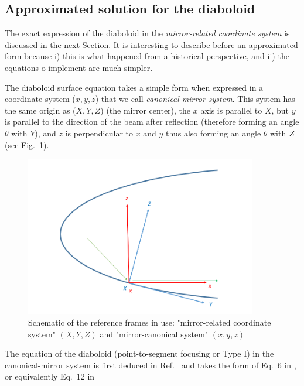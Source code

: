 \documentclass{iucr}              %
\newcommand{\inred}[1]{{\color{red}#1}}
\begin{document}
\inred{
\subsection{Approximated solution for the diaboloid}\label{sec:diaboloidapproximated}
}

The exact expression of the diaboloid in the {\it mirror-related coordinate system} is \inred{discussed in the next Section. It is interesting to describe before an approximated form because i) this is what happened from a historical perspective, and ii) the equations o implement are much simpler.} 


The diaboloid surface equation takes a simple form \cite{Valeriy2020a} when expressed in a coordinate system ($x,y,z$) that we call {\it canonical-mirror system}. This system has the same origin as ($X,Y,Z$) (the mirror center), the $x$ axis is parallel to $X$, but $y$ is parallel to the direction of the beam after reflection (therefore forming an angle $\theta$ with $Y$), and $z$ is perpendicular to $x$ and $y$ thus also forming an angle $\theta$ with $Z$ (see Fig.~\ref{fig:frame}).

\begin{figure}\label{fig:frame}
\centering
\includegraphics[width=0.9\textwidth]{figures/diaboloid_frame.png}
\caption{Schematic of the reference frames in use: "mirror-related coordinate system" $(X,Y,Z)$ and "mirror-canonical system" $(x,y,z)$}
\end{figure}

The equation of the diaboloid (point-to-segment focusing or Type I) in the canonical-mirror system is first deduced in Ref.~\cite{Valeriy2020a} and takes the form \inred{of Eq.~6 in \cite{part2}, or equivalently Eq.~12 in \cite{Goldberg2020}}
\end{document}

